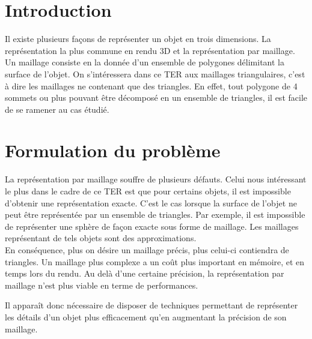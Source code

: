\section{Introduction}
Il existe plusieurs façons de représenter un objet en trois dimensions. La représentation la plus commune en rendu 3D et la représentation
par maillage. Un maillage consiste en la donnée d'un ensemble de polygones délimitant la surface de l'objet. On s'intéressera dans ce TER aux maillages
triangulaires, c'est à dire les maillages ne contenant que des triangles. En effet, tout polygone de 4 sommets ou plus pouvant être décomposé en un
ensemble de triangles, il est facile de se ramener au cas étudié.\\

\section{Formulation du problème}
La représentation par maillage souffre de plusieurs défauts. Celui nous intéressant le plus dans le cadre de ce TER est que pour certains objets,
il est impossible d'obtenir une représentation exacte. C'est le cas lorsque la surface de l'objet ne peut être représentée par un ensemble de triangles.
Par exemple, il est impossible de représenter une sphère de façon exacte sous forme de maillage. Les maillages représentant de tels objets sont des
approximations.\\
En conséquence, plus on désire un maillage précis, plus celui-ci contiendra de triangles. Un maillage plus complexe a un coût
plus important en mémoire, et en temps lors du rendu. Au delà d'une certaine précision, la représentation par maillage n'est plus viable
en terme de performances. 


Il apparaît donc nécessaire de disposer de techniques permettant de représenter les détails d'un objet plus
efficacement qu'en augmentant la précision de son maillage.
